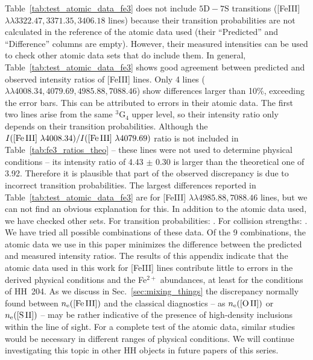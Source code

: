 \documentclass[twocolumn]{aastex63}
\begin{document}
Table~\ref{tab:test_atomic_data_fe3} does not include $5\text{D}-7\text{S}$ transitions ([Fe\thinspace III] $\lambda \lambda 3322.47, 3371.35, 3406.18$ lines) because their transition probabilities are not calculated in the reference of the atomic data used (their ``Predicted'' and ``Difference'' columns are empty). However, their measured intensities can be used to check other atomic data sets that do include them. In general,  Table~\ref{tab:test_atomic_data_fe3} shows good agreement between  predicted and observed intensity ratios of  [Fe\thinspace III] lines. Only 4 lines ($\lambda \lambda 4008.34, 4079.69, 4985.88, 7088.46$) show differences larger than 10\%, exceeding the error bars. This can be attributed to errors in their atomic data. The first two lines arise from the same $^3\text{G}_4$ upper level, so their intensity ratio only depends on their transition probabilities. Although the $I(\text{[Fe\thinspace III] } \lambda 4008.34)/I(\text{[Fe\thinspace III] } \lambda 4079.69)$ ratio is not included in Table~\ref{tab:fe3_ratios_theo} -- these lines were not used to determine physical conditions -- its intensity ratio of 4.43 $\pm$ 0.30 is larger than the theoretical one of 3.92. Therefore it is plausible that part of the observed discrepancy is due to incorrect transition probabilities. The largest differences reported in Table~\ref{tab:test_atomic_data_fe3} are for [Fe\thinspace III] $\lambda \lambda 4985.88, 7088.46$ lines, but we can not find an obvious explanation for this.
In addition to the atomic data used, we have checked other sets. For transition probabilities: \citet[][]{NP96,BBQ10}. For collision strengths: \citet[][]{BBQ10,BB14}. We have tried all possible combinations of these data. Of the 9 combinations, the atomic data we use in this paper minimizes the difference between the predicted and measured intensity ratios. The results of this appendix indicate that the atomic data used in this work for [Fe\thinspace III] lines contribute little to errors in the derived physical conditions and the Fe$^{2+}$ abundances, at least for the conditions of HH~204. As we discuss in Sec.~\ref{sec:mixing_things} the discrepancy normally found between $n_{\rm e}(\text{[Fe\thinspace III]})$ and the classical diagnostics -- as $n_{\rm e}(\text{[O\thinspace II]})$ or $n_{\rm e}(\text{[S\thinspace II]})$ -- may be rather indicative of the presence of high-density inclusions within the line of sight. For a complete test of the atomic data, similar studies would be necessary in different ranges of physical conditions. We will continue investigating this topic in other HH objects in future papers of this series.  
\end{document}
